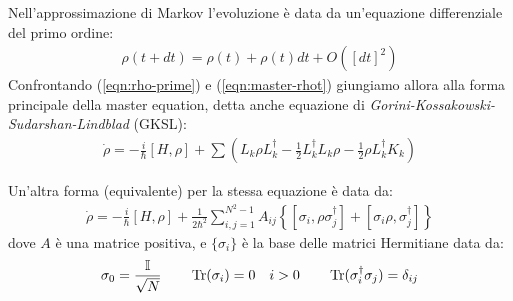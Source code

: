 \documentclass[../../InformazioneQuantistica.tex]{subfiles}
\begin{document}
Nell'approssimazione di Markov l'evoluzione è data da un'equazione differenziale del primo ordine:
\begin{align}
\rho(t+dt) = \rho(t) + \rho(t)dt + O([dt]^2)
\label{eqn:rho-prime}
\end{align}
Confrontando (\ref{eqn:rho-prime}) e (\ref{eqn:master-rhot}) giungiamo allora alla forma principale della master equation, detta anche equazione di \textit{Gorini-Kossakowski-Sudarshan-Lindblad} (GKSL):
\begin{align*}
\dot{\rho} = -\frac{i}{\hbar}[H,\rho] + \sum \left(L_k \rho L_k^\dag - \frac{1}{2}L_k^\dag L_k\rho - \frac{1}{2}\rho L_k^\dag K_k\right)
\end{align*}

Un'altra forma (equivalente) per la stessa equazione è data da:
\begin{align*}
\dot{\rho} = -\frac{i}{\hbar}[H,\rho] + \frac{1}{2\hbar^2}\sum_{i,j=1}^{N^2-1} A_{ij}\left\{[\sigma_i, \rho\sigma_j^\dag] + [\sigma_i\rho, \sigma_j^\dag]\right\}
\end{align*}
dove $A$ è una matrice positiva, e $\{\sigma_i\}$ è la base delle matrici Hermitiane data da:
\begin{align*}
\sigma_0 = \frac{\mathbb{I}}{\sqrt{N}} \qquad \operatorname{Tr}(\sigma_i)=0 \quad i > 0 \qquad \operatorname{Tr}(\sigma_i^\dag \sigma_j) = \delta_{ij}
\end{align*}
\end{document}
